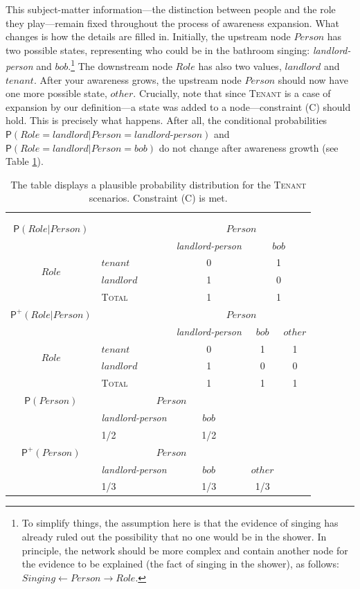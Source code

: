 \documentclass[
  11pt,
  dvipsnames,enabledeprecatedfontcommands]{scrartcl}
\newcommand{\pr}[1]{\ensuremath{\mathsf{P}(#1)}}
\newcommand{\ppr}[2]{\ensuremath{\mathsf{P}^{#1}(#2)}}
\begin{document}
\noindent This subject-matter information---the distinction between
people and the role they play---remain fixed throughout the process of
awareness expansion. What changes is how the details are filled in.
Initially, the upstream node \(Person\) has two possible states,
representing who could be in the bathroom singing:
\textit{landlord-person} and \(bob\).\footnote{To simplify things, the
  assumption here is that the evidence of singing has already ruled out
  the possibility that no one would be in the shower. In principle, the
  network should be more complex and contain another node for the
  evidence to be explained (the fact of singing in the shower), as
  follows:
  \(\textit{Singing}\leftarrow\textit{Person}\rightarrow \textit{Role}\).}
The downstream node \(Role\) has also two values, \(landlord\) and
\(tenant\). After your awareness grows, the upstream node \(Person\)
should now have one more possible state, \(other\). Crucially, note that
since \textsc{Tenant} is a case of expansion by our definition---a state
was added to a node---constraint (C) should hold. This is precisely what
happens. After all, the conditional probabilities
\(\pr{\textit{Role}=\textit{landlord} \vert \textit{Person}=\textit{landlord-person}}\)
and
\(\pr{\textit{Role}=\textit{landlord} \vert \textit{Person}=\textit{bob}}\)
do not change after awareness growth (see Table \ref{table:tenant}).

\begin{table}
\begin{tabular}{clccc}
&&&&\\
&&&&\\
$\pr{Role \vert Person}$ & & \multicolumn{3}{c}{$Person$} \\
 &   & \textit{landlord-person}  & \multicolumn{2}{c}{$bob$} \\
\multirow{2}{*}{$Role$} & $tenant$ & 0 & \multicolumn{2}{c}{1}\\
& $landlord$  & 1 & \multicolumn{2}{c}{0} \\
\hline
& \textsc{Total} & 1 & \multicolumn{2}{c}{1}  \\
\hline
\hline
$\ppr{+}{Role \vert Person}$ & & \multicolumn{3}{c}{$Person$} \\
&  & \textit{landlord-person} & $bob$ & $other$ \\
\multirow{2}{*}{$Role$} & $tenant$ & 0 & 1 & 1\\ 
& $landlord$ & 1 & 0 & 0 \\
\hline
& \textsc{Total} & 1 & 1 & 1  \\
\hline
\hline
$\pr{Person}$ & \multicolumn{2}{c}{$Person$} & \\
&  \textit{landlord-person} & $bob$ & \\
& 1/2 & 1/2 & \\
\hline
\hline
$\ppr{+}{Person}$ & \multicolumn{2}{c}{$Person$} & \\
&  \textit{landlord-person} & $bob$ & $other$ \\
& 1/3 & 1/3 & 1/3 \\
\end{tabular}
\caption{The table displays a plausible probability distribution for the \textsc{Tenant} scenarios. Constraint (C) is met.}
\label{table:tenant}
\end{table}
\end{document}
